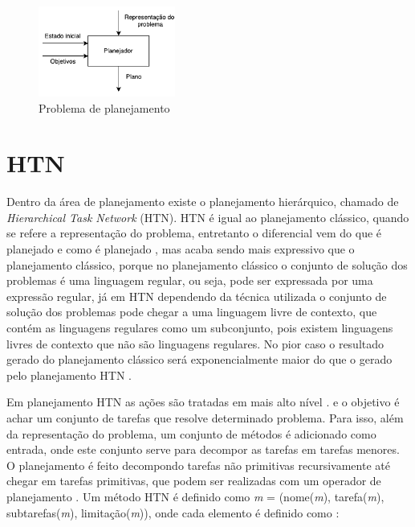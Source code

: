 \begin{figure}[ht]
	\centering
	\includegraphics[width=0.4\textwidth]{fig/modelo.pdf}
	\caption{Problema de planejamento}
	\label{fig:planmodelo}
\end{figure} 

\section{HTN} 

Dentro da área de planejamento existe o planejamento hierárquico, chamado de \textit{Hierarchical Task Network} (HTN). HTN é igual ao planejamento clássico, quando se refere a representação do problema, entretanto o diferencial vem do que é planejado e como é planejado \cite{ghallab2004automated}, mas acaba sendo mais expressivo que o planejamento clássico, porque no planejamento clássico o conjunto de solução dos problemas é uma linguagem regular, ou seja, pode ser expressada por uma expressão regular, já em HTN dependendo da técnica utilizada o conjunto de solução dos problemas pode chegar a uma linguagem livre de contexto, que contém as linguagens regulares como um subconjunto, pois existem linguagens livres de contexto que não são linguagens regulares. No pior caso o resultado gerado do planejamento clássico será exponencialmente maior do que o gerado pelo planejamento HTN \cite{ghallab2004automated}.  

Em planejamento HTN as ações são tratadas em mais alto nível \cite{intelligence2003modern}. e o objetivo é achar um conjunto de tarefas que resolve determinado problema. Para isso, além da representação do problema, um conjunto de métodos é adicionado como entrada, onde este conjunto serve para decompor as tarefas em tarefas menores. O planejamento é feito decompondo tarefas não primitivas recursivamente até chegar em tarefas primitivas, que podem ser realizadas com um operador de planejamento \cite{ghallab2004automated}. Um método HTN é definido como \textit{m} = (nome(\textit{m}), tarefa(\textit{m}), subtarefas(\textit{m}), limitação(\textit{m})), onde cada elemento é definido como \cite{ghallab2004automated}: 

